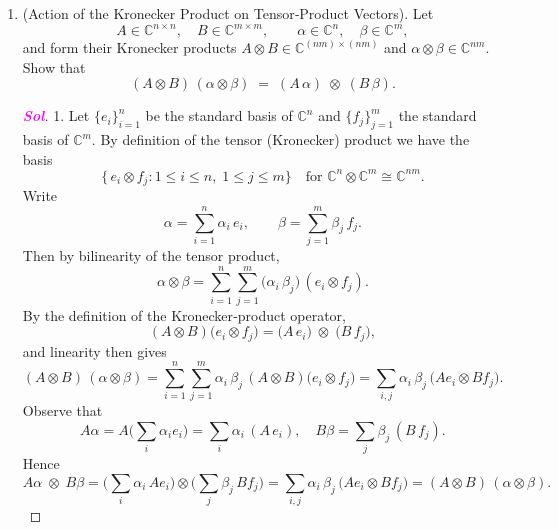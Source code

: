 \begin{enumerate}[\bfseries 1.]
\begin{proof}[\normalfont\bfseries\textcolor{magenta}{Sol}]
\begin{enumerate}[(a)]
\begin{align*}
\begin{pmatrix}
		1 \\ -i
	\end{pmatrix}\quad\text{with}\; t\neq 0,
	\end{align*}
	a normalized eigenvector is $\displaystyle
	\ket{v_1} = \frac1{\sqrt{2}}\begin{pmatrix}1\\[-3pt]-\,i\end{pmatrix}.$ Similarly, we have $\displaystyle
	\ket{v_2} = \frac1{\sqrt{2}}\begin{pmatrix}1\\[-3pt]i\end{pmatrix}.$
\end{enumerate}
\end{proof}	
	\item (Action of the Kronecker Product on Tensor‐Product Vectors).
	Let  
	\[
	A\in\mathbb{C}^{n\times n},\quad B\in\mathbb{C}^{m\times m},
	\qquad
	\alpha\in\mathbb{C}^n,\quad \beta\in\mathbb{C}^m,
	\]  
	and form their Kronecker products \(A\otimes B\in\mathbb{C}^{(nm)\times(nm)}\) and \(\alpha\otimes\beta\in\mathbb{C}^{nm}\).  Show that  
	\[
	(A\otimes B)\,(\alpha\otimes\beta)
	\;=\;
	(A\,\alpha)\;\otimes\;(B\,\beta).
	\]
\begin{proof}[\normalfont\bfseries\textcolor{magenta}{Sol}]
1. Let \(\{e_i\}_{i=1}^n\) be the standard basis of \(\mathbb{C}^n\) and \(\{f_j\}_{j=1}^m\) the standard basis of \(\mathbb{C}^m\).  By definition of the tensor (Kronecker) product we have the basis  
\[
\{\,e_i\otimes f_j : 1\le i\le n,\;1\le j\le m\}\quad\text{for $\mathbb{C}^n\otimes\mathbb{C}^m\cong\mathbb{C}^{nm}$.}
\] Write
\[
\alpha = \sum_{i=1}^n \alpha_i\,e_i,
\qquad
\beta  = \sum_{j=1}^m \beta_j\,f_j.
\]
Then by bilinearity of the tensor product,
\[
\alpha\otimes\beta
= \sum_{i=1}^n\sum_{j=1}^m 
\bigl(\alpha_i\,\beta_j\bigr)\,(e_i\otimes f_j).
\] By the definition of the Kronecker‐product operator, \[
(A\otimes B)\bigl(e_i\otimes f_j\bigr)
= \bigl(A\,e_i\bigr)\;\otimes\;\bigl(B\,f_j\bigr),
\]
and linearity then gives \[
(A\otimes B)\,(\alpha\otimes\beta)
= \sum_{i=1}^n\sum_{j=1}^m \alpha_i\,\beta_j\,
(A\otimes B)\bigl(e_i\otimes f_j\bigr)
= \sum_{i,j} \alpha_i\,\beta_j\,
\bigl(Ae_i\otimes Bf_j\bigr).
\]
Observe that \[
A\alpha
= A\bigl(\sum_i \alpha_i e_i\bigr)
= \sum_i \alpha_i \,(A\,e_i),
\quad
B\beta
= \sum_j \beta_j \,(B\,f_j).
\]
Hence \[
A\alpha\;\otimes\;B\beta
= \biggl(\sum_i\alpha_i\,Ae_i\biggr)
\otimes
\biggl(\sum_j\beta_j\,Bf_j\biggr)
= \sum_{i,j} \alpha_i\,\beta_j\,
\bigl(Ae_i\otimes Bf_j\bigr)=(A\otimes B)\,(\alpha\otimes\beta).
\]
\end{proof}
\end{enumerate}
